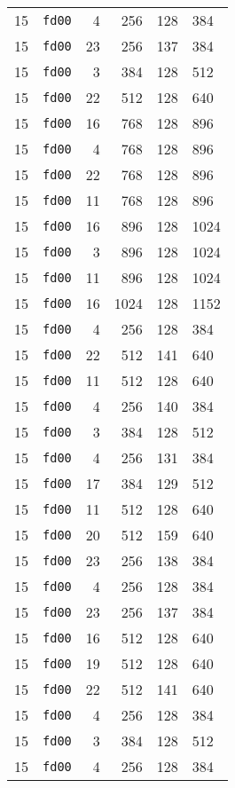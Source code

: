 \documentclass{article}
\begin{document}
\begin{table}[h!]
\begin{tabular}{llrrrl}
    15 & \texttt{fd00} & 4 & 256 & 128 & 384 \\
    15 & \texttt{fd00} & 23 & 256 & 137 & 384 \\
    15 & \texttt{fd00} & 3 & 384 & 128 & 512 \\
    15 & \texttt{fd00} & 22 & 512 & 128 & 640 \\
    15 & \texttt{fd00} & 16 & 768 & 128 & 896 \\
    15 & \texttt{fd00} & 4 & 768 & 128 & 896 \\
    15 & \texttt{fd00} & 22 & 768 & 128 & 896 \\
    15 & \texttt{fd00} & 11 & 768 & 128 & 896 \\
    15 & \texttt{fd00} & 16 & 896 & 128 & 1024 \\
    15 & \texttt{fd00} & 3 & 896 & 128 & 1024 \\
    15 & \texttt{fd00} & 11 & 896 & 128 & 1024 \\
    15 & \texttt{fd00} & 16 & 1024 & 128 & 1152 \\
    15 & \texttt{fd00} & 4 & 256 & 128 & 384 \\
    15 & \texttt{fd00} & 22 & 512 & 141 & 640 \\
    15 & \texttt{fd00} & 11 & 512 & 128 & 640 \\
    15 & \texttt{fd00} & 4 & 256 & 140 & 384 \\
    15 & \texttt{fd00} & 3 & 384 & 128 & 512 \\
    15 & \texttt{fd00} & 4 & 256 & 131 & 384 \\
    15 & \texttt{fd00} & 17 & 384 & 129 & 512 \\
    15 & \texttt{fd00} & 11 & 512 & 128 & 640 \\
    15 & \texttt{fd00} & 20 & 512 & 159 & 640 \\
    15 & \texttt{fd00} & 23 & 256 & 138 & 384 \\
    15 & \texttt{fd00} & 4 & 256 & 128 & 384 \\
    15 & \texttt{fd00} & 23 & 256 & 137 & 384 \\
    15 & \texttt{fd00} & 16 & 512 & 128 & 640 \\
    15 & \texttt{fd00} & 19 & 512 & 128 & 640 \\
    15 & \texttt{fd00} & 22 & 512 & 141 & 640 \\
    15 & \texttt{fd00} & 4 & 256 & 128 & 384 \\
    15 & \texttt{fd00} & 3 & 384 & 128 & 512 \\
    15 & \texttt{fd00} & 4 & 256 & 128 & 384 \\

\end{tabular}
\end{table}
\end{document}
